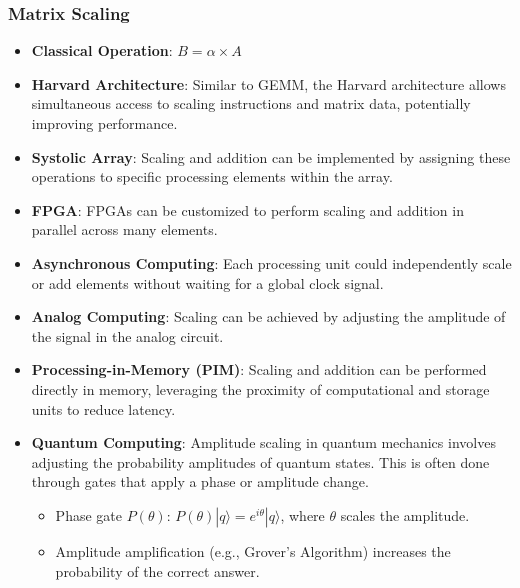 \documentclass{article}
\begin{document}
\subsubsection{Matrix Scaling}
\begin{itemize}
    \item \textbf{Classical Operation}: \( B = \alpha \times A \)
    \item \textbf{Harvard Architecture}: Similar to GEMM, the Harvard architecture allows simultaneous access to scaling instructions and matrix data, potentially improving performance.
    \item \textbf{Systolic Array}: Scaling and addition can be implemented by assigning these operations to specific processing elements within the array.
    \item \textbf{FPGA}: FPGAs can be customized to perform scaling and addition in parallel across many elements.
    \item \textbf{Asynchronous Computing}: Each processing unit could independently scale or add elements without waiting for a global clock signal.
    \item \textbf{Analog Computing}: Scaling can be achieved by adjusting the amplitude of the signal in the analog circuit.
    \item \textbf{Processing-in-Memory (PIM)}: Scaling and addition can be performed directly in memory, leveraging the proximity of computational and storage units to reduce latency.
    \item \textbf{Quantum Computing}: Amplitude scaling in quantum mechanics involves adjusting the probability amplitudes of quantum states. This is often done through gates that apply a phase or amplitude change. 
    \begin{itemize}
        \item Phase gate \( P(\theta) \): \( P(\theta)|q\rangle = e^{i\theta}|q\rangle \), where \( \theta \) scales the amplitude. 
        \item Amplitude amplification (e.g., Grover’s Algorithm) increases the probability of the correct answer.
    \end{itemize}
\end{itemize}
\end{document}
